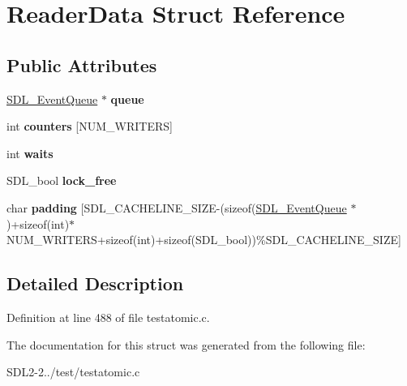 \hypertarget{structReaderData}{\section{Reader\+Data Struct Reference}
\label{structReaderData}
}
\subsection*{Public Attributes}
\begin{DoxyCompactItemize}
\item 
\hypertarget{structReaderData_afd51e47e16260214c404c0e389e7cab2}{\hyperlink{structSDL__EventQueue}{S\+D\+L\+\_\+\+Event\+Queue} $\ast$ {\bfseries queue}}\label{structReaderData_afd51e47e16260214c404c0e389e7cab2}

\item 
\hypertarget{structReaderData_a45d9535de2f107eec2870d12e3dcce5e}{int {\bfseries counters} \mbox{[}N\+U\+M\+\_\+\+W\+R\+I\+T\+E\+R\+S\mbox{]}}\label{structReaderData_a45d9535de2f107eec2870d12e3dcce5e}

\item 
\hypertarget{structReaderData_a7dae85b2767115b318d8ad1e0d4e5a86}{int {\bfseries waits}}\label{structReaderData_a7dae85b2767115b318d8ad1e0d4e5a86}

\item 
\hypertarget{structReaderData_a2566b218909688a23aedf882338bb88d}{S\+D\+L\+\_\+bool {\bfseries lock\+\_\+free}}\label{structReaderData_a2566b218909688a23aedf882338bb88d}

\item 
\hypertarget{structReaderData_ae8c6ceeda4bba21584a7cb05989b9dcb}{char {\bfseries padding} \mbox{[}S\+D\+L\+\_\+\+C\+A\+C\+H\+E\+L\+I\+N\+E\+\_\+\+S\+I\+Z\+E-\/(sizeof(\hyperlink{structSDL__EventQueue}{S\+D\+L\+\_\+\+Event\+Queue} $\ast$)+sizeof(int)$\ast$N\+U\+M\+\_\+\+W\+R\+I\+T\+E\+R\+S+sizeof(int)+sizeof(S\+D\+L\+\_\+bool))\%S\+D\+L\+\_\+\+C\+A\+C\+H\+E\+L\+I\+N\+E\+\_\+\+S\+I\+Z\+E\mbox{]}}\label{structReaderData_ae8c6ceeda4bba21584a7cb05989b9dcb}

\end{DoxyCompactItemize}


\subsection{Detailed Description}


Definition at line 488 of file testatomic.\+c.



The documentation for this struct was generated from the following file\+:\begin{DoxyCompactItemize}
\item 
S\+D\+L2-\/2../test/testatomic.\+c\end{DoxyCompactItemize}

